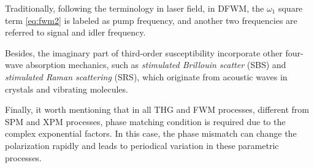 Traditionally, following the terminology in laser field, in DFWM, the $\omega_1$ square term \autoref{eq:fwm2} is labeled as pump frequency, and another two frequencies are referred to signal and idler frequency.

\bigskip
Besides, the imaginary part of third-order susceptibility incorporate other four-wave absorption mechanics, such as \textit{stimulated Brillouin scatter} (SBS) and \textit{stimulated Raman scattering} (SRS), which originate from acoustic waves in crystals and vibrating molecules.

Finally, it worth mentioning that in all THG and FWM processes, different from SPM and XPM processes, phase matching condition is required due to the complex exponential factors. In this case, the phase mismatch can change the polarization rapidly and leads to periodical variation in these parametric processes.


